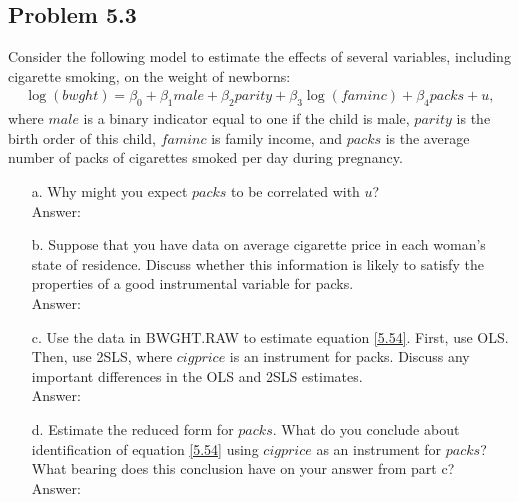\documentclass[10pt]{article}
\begin{document}
\subsection*{Problem 5.3}
Consider the following model to estimate the effects of several variables, including cigarette smoking, on the weight of newborns:
\begin{align}
    \log(bwght)=\beta_0+\beta_1male+\beta_2parity+\beta_3\log(faminc)+\beta_4packs+u, \tag{5.54}\label{5.54}
\end{align}
where $male$ is a binary indicator equal to one if the child is male, $parity$ is the birth order of this child, $faminc$ is family income, and $packs$ is the average number of packs of cigarettes smoked per day during pregnancy.
\begin{enumerate}
\item[a.] Why might you expect $packs$ to be correlated with $u$?
\\ Answer:\\

\item[b.] Suppose that you have data on average cigarette price in each woman's state of residence. Discuss whether this information is likely to satisfy the properties of a good instrumental variable for packs.
\\ Answer:\\

\item[c.] Use the data in BWGHT.RAW to estimate equation \eqref{5.54}. First, use OLS. Then, use 2SLS, where $cigprice$ is an instrument for packs. Discuss any important differences in the OLS and 2SLS estimates.
\\ Answer:\\

\item[d.] Estimate the reduced form for $packs$. What do you conclude about identification of equation \eqref{5.54} using $cigprice$ as an instrument for $packs$? What bearing does this conclusion have on your answer from part c?
\\ Answer:\\

\end{enumerate}
\end{document}
